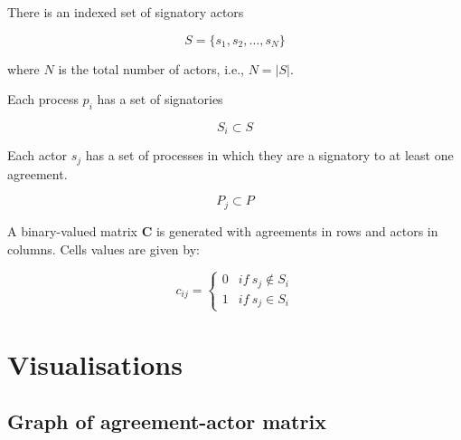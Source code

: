 \documentclass{article}
\begin{document}
There is an indexed set of signatory actors

\begin{equation}
S=\{s_1,s_2,…,s_N\} 
\end{equation}

where $N$ is the total number of actors, i.e., $N=|S|$.\newline

Each process $p_i$ has a set of signatories 

\begin{equation}
S_{i}\subset S
\end{equation}

Each actor $s_j$ has a set of processes in which they are a signatory to at least one agreement.

\begin{equation}
P_{j}\subset P
\end{equation}

A binary-valued matrix $\bm{C}$ is generated with agreements in rows and actors in columns. Cells values are given by:

\begin{equation}
c_{ij} =
\begin{cases}
0& if \ s_j \notin S_{i}\\
1 & if \ s_j \in S_{i}
\end{cases}
\end{equation}

\appendix

\section{Visualisations}

\subsection{Graph of agreement-actor matrix}
\end{document}
